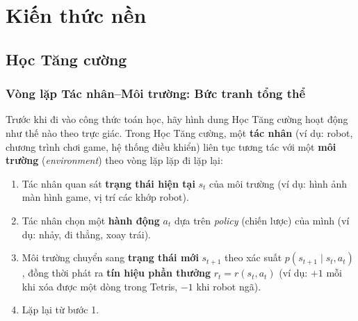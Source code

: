 \section{Kiến thức nền}
 
\subsection{Học Tăng cường}

\subsubsection{Vòng lặp Tác nhân--Môi trường: Bức tranh tổng thể}

Trước khi đi vào công thức toán học, hãy hình dung Học Tăng cường hoạt động như
thế nào theo trực giác. Trong Học Tăng cường, một \textbf{tác nhân} (ví dụ: robot,
chương trình chơi game, hệ thống điều khiển) liên tục tương tác với
một \textbf{môi trường} (\textit{environment}) theo vòng lặp lặp đi
lặp lại:

\begin{enumerate}
    \item Tác nhân quan sát \textbf{trạng thái hiện tại} $s_t$ của môi
    trường (ví dụ: hình ảnh màn hình game, vị trí các khớp robot).
    \item Tác nhân chọn một \textbf{hành động} $a_t$ dựa trên
    \textit{policy} (chiến lược) của mình (ví dụ: nhảy, đi thẳng,
    xoay trái).
    \item Môi trường chuyển sang \textbf{trạng thái mới} $s_{t+1}$
    theo xác suất $p(s_{t+1} \mid s_t, a_t)$, đồng thời phát ra
    \textbf{tín hiệu phần thưởng} $r_t = r(s_t, a_t)$ (ví dụ: $+1$
    mỗi khi xóa được một dòng trong Tetris, $-1$ khi robot ngã).
    \item Lặp lại từ bước 1.
\end{enumerate}

